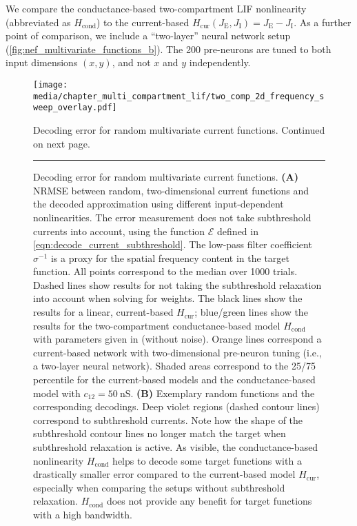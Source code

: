 We compare the conductance-based two-compartment LIF nonlinearity (abbreviated as $H_\mathrm{cond}$) to the current-based $H_\mathrm{cur}(J_\mathrm{E}, J_\mathrm{I}) = J_\mathrm{E} - J_\mathrm{I}$.
As a further point of comparison, we include a \enquote{two-layer} neural network setup (\cref{fig:nef_multivariate_functions_b}). The 200 pre-neurons are tuned to both input dimensions $(x, y)$, and not $x$ and $y$ independently.

\begin{figure}[p]
	\centering
	\kern-158.06mm\texttt{[image: media/chapter\_multi\_compartment\_lif/two\_comp\_2d\_frequency\_sweep\_overlay.pdf]}
	\begin{subfigure}{0cm}\label{fig:frequency_sweep_a}\end{subfigure}%
	\begin{subfigure}{0cm}\label{fig:frequency_sweep_b}\end{subfigure}%
	\caption[Decoding error for random multivariate current functions]{Decoding error for random multivariate current functions. Continued on next page.}
	\label{fig:two_comp_lif_frequency_sweep}
\end{figure}

\addtocounter{figure}{-1}
\begin{figure}[t]
	\caption[]{Decoding error for random multivariate current functions.
	\textbf{(A)} NRMSE between random, two-dimensional current functions and the decoded approximation using different input-dependent nonlinearities. The error measurement does not take subthreshold currents into account, using the function $\mathcal{E}$ defined in \cref{eqn:decode_current_subthreshold}. The low-pass filter coefficient $\sigma^{-1}$ is a proxy for the spatial frequency content in the target function. All points correspond to the median over \num{1000} trials. Dashed lines show results for not taking the subthreshold relaxation into account when solving for weights. The black lines show the results for a linear, current-based $H_\mathrm{cur}$; blue/green lines show the results for the two-compartment conductance-based model  $H_\mathrm{cond}$ with parameters given in  (without noise). Orange lines correspond a current-based network with two-dimensional pre-neuron tuning (i.e., a two-layer neural network). Shaded areas correspond to the 25/75 percentile for the current-based models and the conductance-based model with $c_{12} = \SI{50}{\nano\siemens}$.
	\textbf{(B)} Exemplary random functions and the corresponding decodings. Deep violet regions (dashed contour lines) correspond to subthreshold currents. Note how the shape of the subthreshold contour lines no longer match the target when subthreshold relaxation is active. As visible, the conductance-based nonlinearity $H_\mathrm{cond}$ helps to decode some target functions with a drastically smaller error compared to the current-based model $H_\mathrm{cur}$, especially when comparing the setups without subthreshold relaxation. $H_\mathrm{cond}$ does not provide any benefit for target functions with a high bandwidth.
	}
	\rule{\columnwidth}{1pt}
\end{figure}

